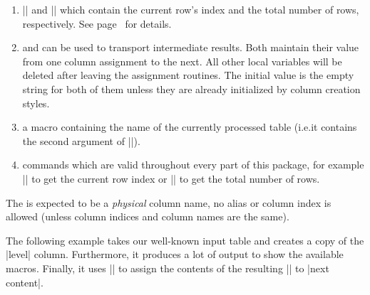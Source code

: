 \documentclass[a4paper]{ltxdoc}
\begin{document}
\begin{command}{\pgfplotstablecreatecol{}}
\begin{enumerate}
            The argument  has to denote either an existing
            column name or one for which an |alias/| exists.
        \item |\pgfplotstablerow| and |\pgfplotstablerows| which contain the
            current row's index and the total number of rows, respectively.
            See page~\pageref{pgfplotstable:page:tablerow} for details.
        \item \declareandlabel{\pgfmathaccuma} and
            \declareandlabel{\pgfmathaccumb} can be used to transport
            intermediate results. Both maintain their value from one column
            assignment to the next. All other local variables will be deleted
            after leaving the assignment routines. The initial value is the
            empty string for both of them unless they are already initialized
            by column creation styles.
        \item \declareandlabel{\pgfplotstablename} a macro containing the
            name of the currently processed table (i.e.\@ it contains the
            second argument of |\pgfplotstablecreatecol|).
        \item commands which are valid throughout every part of this package,
            for example |\pgfplotstablerow| to get the current row index or
            |\pgfplotstablerows| to get the total number of rows.
    \end{enumerate}
    The  is expected to be a \emph{physical} column name, no
    alias or column index is allowed (unless column indices and column names
    are the same).

    The following example takes our well-known input table and creates a copy
    of the |level| column. Furthermore, it produces a lot of output to show the
    available macros. Finally, it uses |\pgfkeyslet| to assign the contents of
    the resulting |\entry| to |next content|.
\begin{codeexample}[]
\loadedtable
{}\loadedtable

\pgfplotstabletypeset[
    column type=l,
    columns={level,new},
    columns/new/.style={string type}
]\loadedtable
\end{codeexample}


\end{command}
\end{document}
